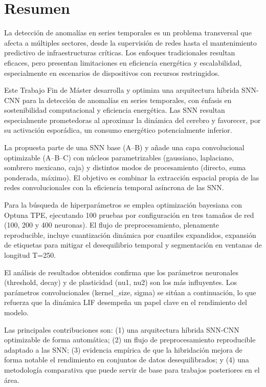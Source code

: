 \chapter*{Resumen}
\label{chap:resumen}

La detección de anomalías en series temporales es un problema transversal que afecta a múltiples sectores, desde la supervisión de redes hasta el mantenimiento predictivo de infraestructuras críticas. Los enfoques tradicionales resultan eficaces, pero presentan limitaciones en eficiencia energética y escalabilidad, especialmente en escenarios de dispositivos con recursos restringidos.

Este Trabajo Fin de Máster desarrolla y optimiza una arquitectura híbrida SNN-CNN para la detección de anomalías en series temporales, con énfasis en sostenibilidad computacional y eficiencia energética. Las SNN resultan especialmente prometedoras al aproximar la dinámica del cerebro y favorecer, por su activación esporádica, un consumo energético potencialmente inferior.

La propuesta parte de una SNN base (A--B) y añade una capa convolucional optimizable (A--B--C) con núcleos parametrizables (gaussiano, laplaciano, sombrero mexicano, caja) y distintos modos de procesamiento (directo, suma ponderada, máximo). El objetivo es combinar la extracción espacial propia de las redes convolucionales con la eficiencia temporal asíncrona de las SNN.

Para la búsqueda de hiperparámetros se emplea optimización bayesiana con Optuna TPE, ejecutando 100 pruebas por configuración en tres tamaños de red (100, 200 y 400 neuronas). El flujo de preprocesamiento, plenamente reproducible, incluye cuantización dinámica por cuantiles expandidos, expansión de etiquetas para mitigar el desequilibrio temporal y segmentación en ventanas de longitud T=250.

El análisis de resultados obtenidos confirma que los parámetros neuronales (threshold, decay) y de plasticidad (nu1, nu2) son los más influyentes. Los parámetros convolucionales (kernel\_size, sigma) se sitúan a continuación, lo que refuerza que la dinámica LIF desempeña un papel clave en el rendimiento del modelo.

Las principales contribuciones son: (1) una arquitectura híbrida SNN-CNN optimizable de forma automática; (2) un flujo de preprocesamiento reproducible adaptado a las SNN; (3) evidencia empírica de que la hibridación mejora de forma notable el rendimiento en conjuntos de datos desequilibrados; y (4) una metodología comparativa que puede servir de base para trabajos posteriores en el área.

